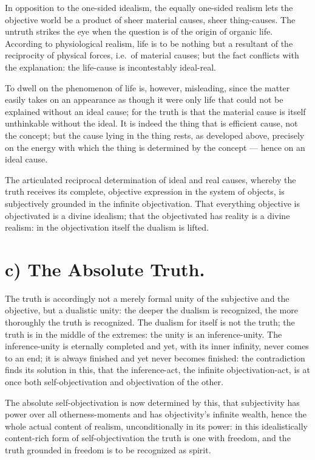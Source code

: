 \documentclass[12pt]{book}
\begin{document}
In opposition to the one-sided idealism, the equally one-sided
realism lets the objective world be a product of sheer material
causes, sheer thing-causes. The untruth strikes the eye when the
question is of the origin of organic life. According to
physiological realism, life is to be nothing but a resultant of the
reciprocity of physical forces, i.e.\ of material causes; but the
fact conflicts with the explanation: the life-cause is incontestably
ideal-real.

To dwell on the phenomenon of life is, however, misleading, since
the matter easily takes on an appearance as though it were only life
that could not be explained without an ideal cause; for the truth is
that the material cause is itself unthinkable without the ideal. It
is indeed the thing that is efficient cause, not the concept; but
the cause lying in the thing rests, as developed above, precisely on
the energy with which the thing is determined by the concept ---
hence on an ideal cause.

The articulated reciprocal determination of ideal and real causes,
whereby the truth receives its complete, objective expression in the
system of objects, is subjectively grounded in the infinite
objectivation. That everything objective is objectivated is a divine
idealism; that the objectivated has reality is a divine realism: in
the objectivation itself the dualism is lifted.
\section*{c) The Absolute Truth.}

The truth is accordingly not a merely formal unity of the subjective
and the objective, but a dualistic unity: the deeper the dualism is
recognized, the more thoroughly the truth is recognized. The dualism
for itself is not the truth; the truth is in the middle of the
extremes: the unity is an inference-unity. The inference-unity is
eternally completed and yet, with its inner infinity, never comes to
an end; it is always finished and yet never becomes finished: the
contradiction finds its solution in this, that the inference-act,
the infinite objectivation-act, is at once both self-objectivation
and objectivation of the other.

The absolute self-objectivation is now determined by this, that
subjectivity has power over all otherness-moments and has
objectivity's infinite wealth, hence the whole actual content of
realism, unconditionally in its power: in this idealistically
content-rich form of self-objectivation the truth is one with
freedom, and the truth grounded in freedom is to be recognized as
spirit.
\end{document}
